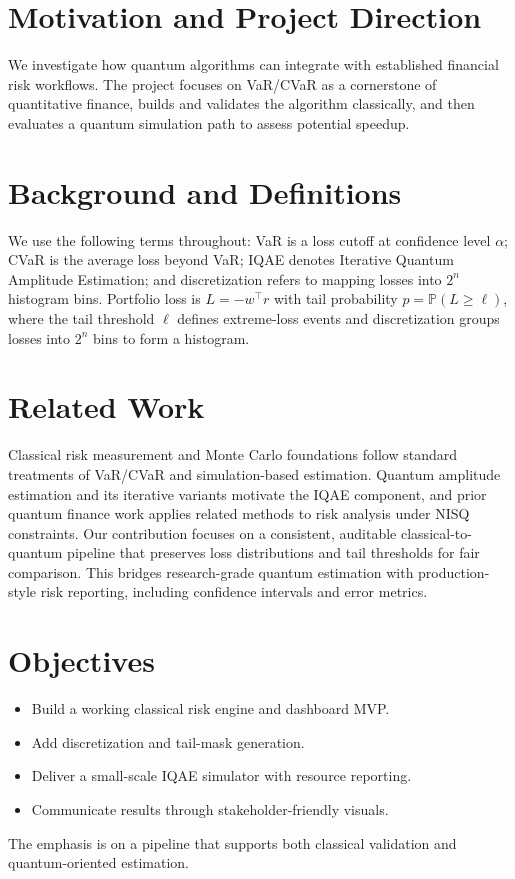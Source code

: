 \documentclass[conference]{IEEEtran}
\begin{document}
\section{Motivation and Project Direction}
We investigate how quantum algorithms can integrate with established financial risk workflows. The project focuses on VaR/CVaR as a cornerstone of quantitative finance, builds and validates the algorithm classically, and then evaluates a quantum simulation path to assess potential speedup.

\section{Background and Definitions}
We use the following terms throughout: VaR is a loss cutoff at confidence level $\alpha$; CVaR is the average loss beyond VaR; IQAE denotes Iterative Quantum Amplitude Estimation; and discretization refers to mapping losses into $2^n$ histogram bins. Portfolio loss is $L = -w^\top r$ with tail probability $p = \mathbb{P}(L \ge \ell)$, where the tail threshold $\ell$ defines extreme-loss events and discretization groups losses into $2^n$ bins to form a histogram.

\section{Related Work}
Classical risk measurement and Monte Carlo foundations follow standard treatments of VaR/CVaR and simulation-based estimation. Quantum amplitude estimation and its iterative variants motivate the IQAE component, and prior quantum finance work applies related methods to risk analysis under NISQ constraints. Our contribution focuses on a consistent, auditable classical-to-quantum pipeline that preserves loss distributions and tail thresholds for fair comparison. This bridges research-grade quantum estimation with production-style risk reporting, including confidence intervals and error metrics.

\section{Objectives}
\begin{itemize}
    \item Build a working classical risk engine and dashboard MVP.
    \item Add discretization and tail-mask generation.
    \item Deliver a small-scale IQAE simulator with resource reporting.
    \item Communicate results through stakeholder-friendly visuals.
\end{itemize}
The emphasis is on a pipeline that supports both classical validation and quantum-oriented estimation.
\end{document}
